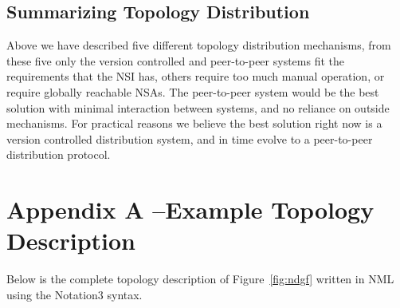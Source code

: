 \documentclass[12pt]{article}  %
\begin{document}
\subsection{Summarizing Topology Distribution}

 Above we have described five different topology distribution mechanisms, 
from these five only the version controlled and peer-to-peer systems fit the requirements 
that the NSI has, others require too much manual operation, or require globally 
reachable NSAs. The peer-to-peer system would be the best solution with minimal 
interaction between systems, and no reliance on outside mechanisms. For practical 
reasons we believe the best solution right now is a version controlled distribution 
system, and in time evolve to a peer-to-peer distribution protocol.\label{h.j5x37xsutbrh}


\section*{Appendix A –Example Topology Description}\label{app:A}

 Below is the complete topology description of Figure~\ref{fig:ndgf} written 
in NML using the Notation3 syntax.
\end{document}
